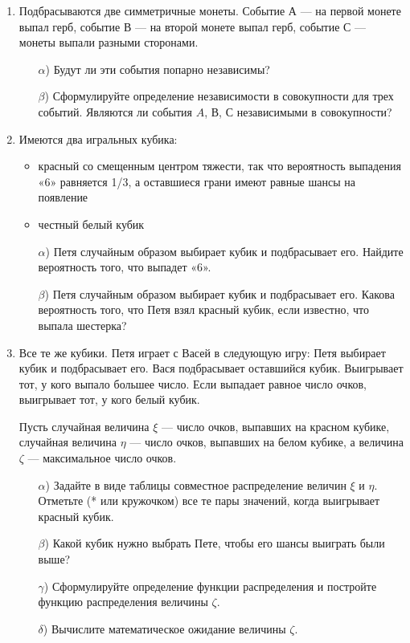 \documentclass[12pt, a4paper]{article}\usepackage[]{graphicx}\usepackage[]{color}
\begin{document}
\begin{enumerate}
\item
Подбрасываются две симметричные монеты. Событие А — на первой монете выпал
герб, событие В — на второй монете выпал герб, событие С — монеты выпали
разными сторонами.
\begin{enumerate}
    \item[$\alpha$)] Будут ли эти события попарно независимы?
    \item[$\beta$)]  Сформулируйте определение независимости в совокупности для трех событий. Являются ли события $A$, $В$, $С$ независимыми в совокупности?
\end{enumerate}

\item
Имеются два игральных кубика:
\begin{itemize}
    \item красный со смещенным центром тяжести, так что вероятность выпадения «6»
    равняется 1/3, а оставшиеся грани имеют равные шансы на появление
    \item честный белый кубик
\end{itemize}

\begin{enumerate}
    \item[$\alpha$)] Петя случайным образом выбирает кубик и подбрасывает его. Найдите
    вероятность того, что выпадет «6».
    \item[$\beta$)]   Петя случайным образом выбирает кубик и подбрасывает его. Какова
    вероятность того, что Петя взял красный кубик, если известно, что выпала
    шестерка?
\end{enumerate}

\item
Все те же кубики. Петя играет с Васей в следующую игру: Петя выбирает кубик и
подбрасывает его. Вася подбрасывает оставшийся кубик. Выигрывает тот, у кого
выпало большее число. Если выпадает равное число очков, выигрывает тот, у кого
белый кубик.

Пусть случайная величина $\xi$ — число очков, выпавших на красном кубике, случайная величина $\eta$ — число очков,
выпавших на белом кубике, а величина $\zeta$ — максимальное число очков.

\begin{enumerate}
    \item[$\alpha$)] Задайте в виде таблицы совместное распределение величин $\xi$ и $\eta$. Отметьте (* или кружочком) все те пары значений, когда выигрывает красный кубик.
    \item[$\beta$)] Какой кубик нужно выбрать Пете, чтобы его шансы выиграть были выше?
    \item[$\gamma$)] Сформулируйте определение функции распределения и постройте функцию
    распределения величины $\zeta$.
    \item[$\delta$)] Вычислите математическое ожидание величины $\zeta$.
\end{enumerate}


\end{enumerate}
\end{document}
